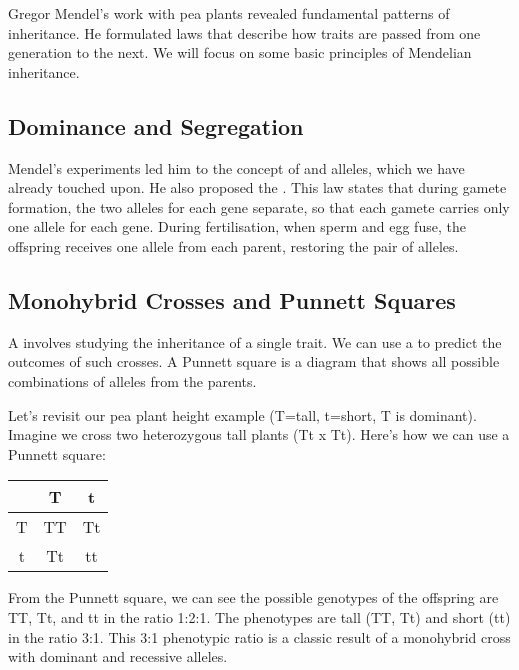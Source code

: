 Gregor Mendel's work with pea plants revealed fundamental patterns of inheritance. He formulated laws that describe how traits are passed from one generation to the next.  We will focus on some basic principles of Mendelian inheritance.

\subsection{Dominance and Segregation}

Mendel's experiments led him to the concept of  and  alleles, which we have already touched upon.  He also proposed the . This law states that during gamete formation, the two alleles for each gene separate, so that each gamete carries only one allele for each gene.  During fertilisation, when sperm and egg fuse, the offspring receives one allele from each parent, restoring the pair of alleles.

\begin{marginnote}
\end{marginnote}

\subsection{Monohybrid Crosses and Punnett Squares}

A  involves studying the inheritance of a single trait.  We can use a  to predict the outcomes of such crosses.  A Punnett square is a diagram that shows all possible combinations of alleles from the parents.

Let's revisit our pea plant height example (T=tall, t=short, T is dominant).  Imagine we cross two heterozygous tall plants (Tt x Tt).  Here's how we can use a Punnett square:

\begin{center}
\begin{tabular}{c|cc}
 & T & t \\
\hline
T & TT & Tt \\
t & Tt & tt \\
\end{tabular}
\end{center}

From the Punnett square, we can see the possible genotypes of the offspring are TT, Tt, and tt in the ratio 1:2:1.  The phenotypes are tall (TT, Tt) and short (tt) in the ratio 3:1.  This 3:1 phenotypic ratio is a classic result of a monohybrid cross with dominant and recessive alleles.

